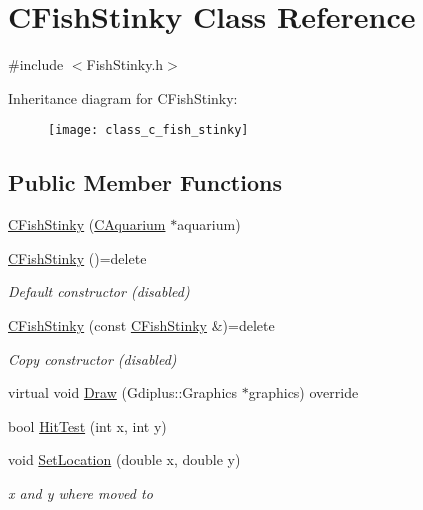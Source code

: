 \hypertarget{class_c_fish_stinky}{}\section{C\+Fish\+Stinky Class Reference}
\label{class_c_fish_stinky}


{\ttfamily \#include $<$Fish\+Stinky.\+h$>$}

Inheritance diagram for C\+Fish\+Stinky\+:\begin{figure}[H]
\begin{center}
\leavevmode
\texttt{[image: class\_c\_fish\_stinky]}
\end{center}
\end{figure}
\subsection*{Public Member Functions}
\begin{DoxyCompactItemize}
\item 
\mbox{\hyperlink{class_c_fish_stinky_a811254ce4150bbc4f6740a4f6fb75ff5}{C\+Fish\+Stinky}} (\mbox{\hyperlink{class_c_aquarium}{C\+Aquarium}} $\ast$aquarium)
\item 
\mbox{\label{class_c_fish_stinky_a770e7c57bc8f5b3bec8eae9c5ff9bc8e}} 
\mbox{\hyperlink{class_c_fish_stinky_a770e7c57bc8f5b3bec8eae9c5ff9bc8e}{C\+Fish\+Stinky}} ()=delete
\begin{DoxyCompactList}\small\item\em Default constructor (disabled) \end{DoxyCompactList}\item 
\mbox{\label{class_c_fish_stinky_ade2a421d7ee53600fb3f189b0c6bf2be}} 
\mbox{\hyperlink{class_c_fish_stinky_ade2a421d7ee53600fb3f189b0c6bf2be}{C\+Fish\+Stinky}} (const \mbox{\hyperlink{class_c_fish_stinky}{C\+Fish\+Stinky}} \&)=delete
\begin{DoxyCompactList}\small\item\em Copy constructor (disabled) \end{DoxyCompactList}\item 
virtual void \mbox{\hyperlink{class_c_fish_stinky_a48dd9938cc3750b6a2831a71dd8b6eb0}{Draw}} (Gdiplus\+::\+Graphics $\ast$graphics) override
\item 
bool \mbox{\hyperlink{class_c_fish_stinky_a5dadb91a76b3d573e3c6fc4e55d7ad58}{Hit\+Test}} (int x, int y)
\item 
void \mbox{\hyperlink{class_c_fish_stinky_aef706c721726a98f4e98cd335af2bd00}{Set\+Location}} (double x, double y)
\begin{DoxyCompactList}\small\item\em x and y where moved to \end{DoxyCompactList}\end{DoxyCompactItemize}
